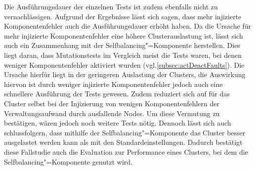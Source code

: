 Die Ausführungsdauer der einzelnen Tests ist zudem ebenfalls nicht zu vernachlässigen.
Aufgrund der Ergebnisse lässt sich sagen, dass mehr injizierte Komponentenfehler auch die Ausführungsdauer erhöht haben.
Da die Ursache für mehr injizierte Komponentenfehler eine höhere Clusterauslastung ist, lässt sich auch ein Zusammenhang mit der Selfbalancing"=Komponente \cite{Zhang2016} herstellen.
Dies liegt daran, dass Mutationstests im Vergleich meist die Tests waren, bei denen weniger Komponentenfehler aktiviert wurden (vgl.\cref{subsec:actDeactFaults}).
Die Ursache hierfür liegt in der geringeren Auslastung der Clusters, die Auswirkung hiervon ist durch weniger injizierte Komponentenfehler jedoch auch eine schnellere Ausführung der Tests gewesen.
Zudem reduziert sich auf für das Cluster selbst bei der Injizierung von wenigen Komponentenfehlern der Verwaltungsaufwand durch ausfallende Nodes.
Um diese Vermutung zu bestätigen, wären jedoch noch weitere Tests nötig.
Dennoch lässt sich auch schlussfolgern, dass mithilfe der Selfbalancing"=Komponente das Cluster besser ausgelastet werden kann als mit den Standardeinstellungen.
Dadurch bestätigt diese Fallstudie auch die Evaluation \cite{Zhang2016} zur Performance eines Clusters, bei dem die Selfbalancing"=Komponente genutzt wird.
